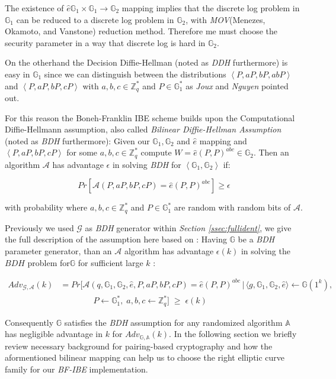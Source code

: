 The existence of $\hat{e} \mathbb{G}_1 \times \mathbb{G}_1 \rightarrow \mathbb{G}_2$ mapping implies that the discrete log problem in $\mathbb{G}_1$ can be reduced to a discrete log problem in $\mathbb{G}_2$, with \textit{MOV}(Menezes, Okamoto, and Vanstone) reduction method.\cite{BF01} Therefore me must choose the security parameter in a way that discrete log is hard in $\mathbb{G}_2$.

On the otherhand the Decision Diffie-Hellman (noted as \textit{DDH} furthermore) is easy in $\mathbb{G}_1$ since we can distinguish between the distributions $\left<  P, aP, bP, abP \right> $ and $\left< P, aP, bP, cP \right>$  with $a,b,c \in \mathbb{Z}^*_q$ and $P \in \mathbb{G}^*_1$ as \textit{Joux} and \textit{Nguyen} pointed out. \cite{BF01}

For this reason the Boneh-Franklin IBE scheme builds upon the Computational Diffie-Hellmann assumption, also called \textit{Bilinear Diffie-Hellman Assumption} (noted as \textit{BDH} furthermore): Given our $\mathbb{G}_1, \mathbb{G}_2$ and $\hat{e}$ mapping and $\left< P, aP, bP, cP\right>$ for some $a,b,c \in \mathbb{Z}^*_q$ compute $W = \hat{e}(P,P)^{abc} \in \mathbb{G}_2$. Then an algorithm 
$\mathcal{A}$ has advantage $\epsilon$ in solving \textit{BDH} for $\left< \mathbb{G}_1, \mathbb{G}_2 \right>$ if: 

\begin{equation}
	Pr \left[ \mathcal{A}(P, aP, bP, cP) = \hat{e}(P,P)^{abc} \right] \geq \epsilon
\end{equation}

with probability where $a,b,c \in \mathbb{Z}^*_q$ and $P \in \mathbb{G}^*_1$ are random with random bits of $\mathcal{A}$.\cite{BF01}

Previously we used $\mathcal{G}$ as \textit{BDH} generator within \textit{Section \ref{ssec:fullident}}, we give the full description of the assumption here based on \cite{BF01}: Having $\mathbb{G}$ be a \textit{BDH} parameter generator, than an $\mathcal{A}$ algorithm has advantage $\epsilon(k)$ in solving the $BDH$ problem for$\mathbb{G}$ for sufficient large $k$ \cite{BF01}: 

\begin{equation}
	\begin{aligned}
		Adv_{\mathcal{G},\mathcal{A}}(k)
		&= Pr\Big[
		\mathcal{A}(q,\mathbb{G}_1,\mathbb{G}_2,\hat{e},P,aP,bP,cP)
		= \hat{e}(P,P)^{abc} \,\Big|\,
		\langle g, \mathbb{G}_1,\mathbb{G}_2,\hat{e}\rangle \gets \mathbb{G}(1^k), \\
		&\qquad\qquad
		P \gets \mathbb{G}_1^*,\;
		a,b,c \gets \mathbb{Z}_q^*
		\Big]
		\;\ge\; \epsilon(k)
	\end{aligned}
\end{equation}


 Consequently $\mathbb{G}$ satisfies the \textit{BDH} assumption for any randomized algorithm $\mathbb{A}$ has negligible advantage in $k$ for $Adv_{\mathbb{G}, \mathbb{A}}(k)$. In the following section we briefly review necessary background for pairing-based cryptography and how the aformentioned bilinear mapping can help us to choose the right elliptic curve family for our \textit{BF-IBE} implementation.
